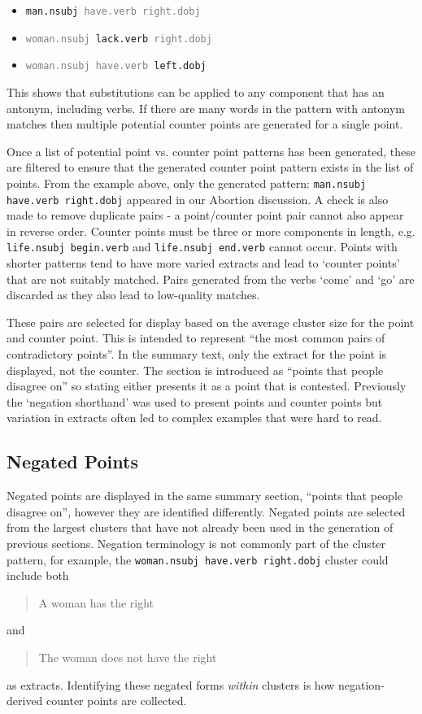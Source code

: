       \begin{itemize}[label={$\bullet$}]
        \item{\texttt{man.nsubj \textcolor{gray}{have.verb right.dobj}}}
        \item{\texttt{\textcolor{gray}{woman.nsubj} lack.verb \textcolor{gray}{right.dobj}}}
        \item{\texttt{\textcolor{gray}{woman.nsubj have.verb} left.dobj}}
      \end{itemize}

      This shows that substitutions can be applied to any component that has an antonym, including verbs. If there are many words in the pattern with antonym matches then multiple potential counter points are generated for a single point.

      Once a list of potential point vs. counter point patterns has been generated, these are filtered to ensure that the generated counter point pattern exists in the list of points. From the example above, only the generated pattern: \texttt{man.nsubj have.verb right.dobj} appeared in our Abortion discussion. A check is also made to remove duplicate pairs - a point/counter point pair cannot also appear in reverse order. Counter points must be three or more components in length, e.g. \texttt{life.nsubj begin.verb} and \texttt{life.nsubj end.verb} cannot occur. Points with shorter patterns tend to have more varied extracts and lead to `counter points' that are not suitably matched. Pairs generated from the verbs `come' and `go' are discarded as they also lead to low-quality matches.

      These pairs are selected for display based on the average cluster size for the point and counter point. This is intended to represent ``the most common pairs of contradictory points''. In the summary text, only the extract for the point is displayed, not the counter. The section is introduced as ``points that people disagree on'' so stating either presents it as a point that is contested. Previously the `negation shorthand' was used to present points and counter points but variation in extracts often led to complex examples that were hard to read.

    \subsection{Negated Points}
      Negated points are displayed in the same summary section, ``points that people disagree on'', however they are identified differently. Negated points are selected from the largest clusters that have not already been used in the generation of previous sections. Negation terminology is not commonly part of the cluster pattern, for example, the \texttt{woman.nsubj have.verb right.dobj} cluster could include both \blockquote{A woman has the right} and \blockquote{The woman does not have the right} as extracts. Identifying these negated forms \textit{within} clusters is how negation-derived counter points are collected.

